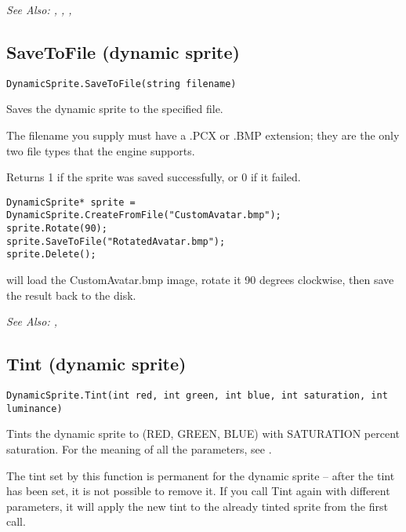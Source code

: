 \it{See Also:} ,
,
,


\subsection{SaveToFile (dynamic sprite)}\label{DynamicSprite.SaveToFile}%

\begin{verbatim}
DynamicSprite.SaveToFile(string filename)
\end{verbatim}
Saves the dynamic sprite to the specified file.

The filename you supply must have a .PCX or .BMP extension; they are the only
two file types that the engine supports.

Returns 1 if the sprite was saved successfully, or 0 if it failed.

\begin{verbatim}
DynamicSprite* sprite = DynamicSprite.CreateFromFile("CustomAvatar.bmp");
sprite.Rotate(90);
sprite.SaveToFile("RotatedAvatar.bmp");
sprite.Delete();
\end{verbatim}
will load the CustomAvatar.bmp image, rotate it 90 degrees clockwise, then
save the result back to the disk.

\it{See Also:} ,


\subsection{Tint (dynamic sprite)}\label{DynamicSprite.Tint}%

\begin{verbatim}
DynamicSprite.Tint(int red, int green, int blue, int saturation, int luminance)
\end{verbatim}
Tints the dynamic sprite to (RED, GREEN, BLUE) with SATURATION percent
saturation. For the meaning of all the parameters, see .

The tint set by this function is permanent for the dynamic sprite -- after the tint
has been set, it is not possible to remove it. If you call Tint again with different
parameters, it will apply the new tint to the already tinted sprite from the first call.

